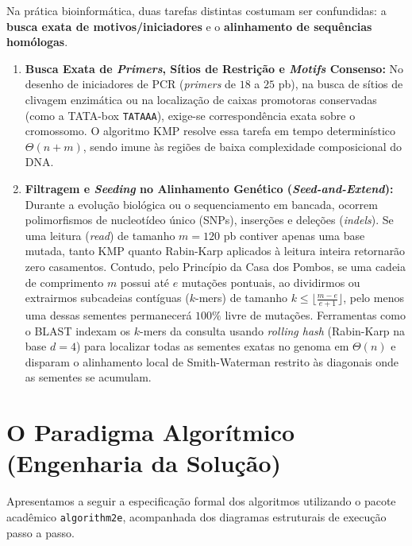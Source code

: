 \documentclass[12pt,a4paper]{article}
\begin{document}
Na pr\'atica bioinform\'atica, duas tarefas distintas costumam ser confundidas: a \textbf{busca exata de motivos/iniciadores} e o \textbf{alinhamento de sequ\^encias hom\'ologas}.
\begin{enumerate}
    \item \textbf{Busca Exata de \textit{Primers}, S\'itios de Restri\c{c}\~ao e \textit{Motifs} Consenso:} No desenho de iniciadores de PCR (\textit{primers} de $18$ a $25$ pb), na busca de s\'itios de clivagem enzim\'atica ou na localiza\c{c}\~ao de caixas promotoras conservadas (como a TATA-box \texttt{TATAAA}), exige-se correspond\^encia exata sobre o cromossomo. O algoritmo KMP resolve essa tarefa em tempo determin\'istico $\Theta(n+m)$, sendo imune \`as regi\~oes de baixa complexidade composicional do DNA.
    \item \textbf{Filtragem e \textit{Seeding} no Alinhamento Gen\'etico (\textit{Seed-and-Extend}):} Durante a evolu\c{c}\~ao biol\'ogica ou o sequenciamento em bancada, ocorrem polimorfismos de nucleot\'ideo \'unico (SNPs), inser\c{c}\~oes e dele\c{c}\~oes (\textit{indels}). Se uma leitura (\textit{read}) de tamanho $m = 120$ pb contiver apenas uma base mutada, tanto KMP quanto Rabin-Karp aplicados \`a leitura inteira retornar\~ao zero casamentos. Contudo, pelo Princ\'ipio da Casa dos Pombos, se uma cadeia de comprimento $m$ possui at\'e $e$ muta\c{c}\~oes pontuais, ao dividirmos ou extrairmos subcadeias cont\'iguas ($k$-mers) de tamanho $k \le \lfloor \frac{m - e}{e + 1} \rfloor$, pelo menos uma dessas sementes permanecer\'a $100\%$ livre de muta\c{c}\~oes. Ferramentas como o BLAST \cite{altschul1990} indexam os $k$-mers da consulta usando \textit{rolling hash} (Rabin-Karp na base $d=4$) para localizar todas as sementes exatas no genoma em $\Theta(n)$ e disparam o alinhamento local de Smith-Waterman restrito \`as diagonais onde as sementes se acumulam.
\end{enumerate}

\section{O Paradigma Algor\'itmico (Engenharia da Solu\c{c}\~ao)}

Apresentamos a seguir a especifica\c{c}\~ao formal dos algoritmos utilizando o pacote acad\^emico \texttt{algorithm2e}, acompanhada dos diagramas estruturais de execu\c{c}\~ao passo a passo.
\end{document}
